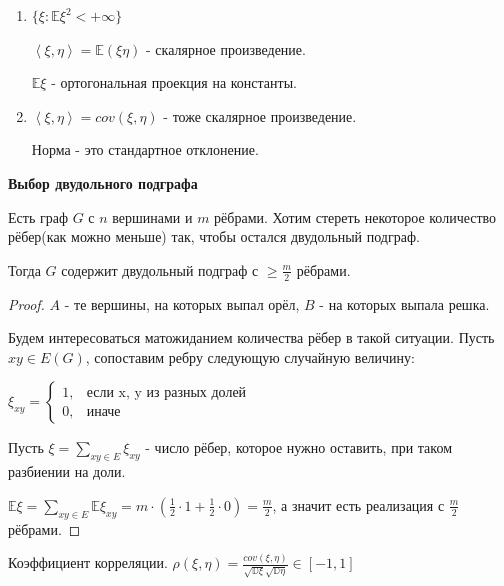 \begin{remark}
    \begin{enumerate}
        \item {
            $\{ \xi : \mathbb{E} \xi^2 < +\infty \}$

            $\left <\xi, \eta \right > = \mathbb{E} (\xi \eta)$ - скалярное произведение.

            $\mathbb{E} \xi$ - ортогональная проекция на константы.
        }
        \item {
            $\left < \xi, \eta \right > = cov (\xi, \eta)$ - тоже скалярное произведение.

            Норма - это стандартное отклонение.
        }
    \end{enumerate}
\end{remark}

\begin{theorem}
    \textbf{Выбор двудольного подграфа}

    Есть граф $G$ с $n$ вершинами и $m$ рёбрами. Хотим стереть некоторое количество рёбер(как можно меньше) так, чтобы
    остался двудольный подграф.

    Тогда $G$ содержит двудольный подграф с $\geqslant \frac{m}{2}$ рёбрами.
\end{theorem}

\begin{proof}
    $A$ - те вершины, на которых выпал орёл, $B$ - на которых выпала решка.

    Будем интересоваться матожиданием количества рёбер в такой ситуации. Пусть $xy \in E(G)$, сопоставим ребру
    следующую случайную величину:

    $
    \xi_{xy} =
    \begin{cases}
        1, & \text{если x, y из разных долей} \\
        0, & \text{иначе}
    \end{cases}
    $

    Пусть $\xi = \sum_{xy \in E} \xi_{xy}$ - число рёбер, которое нужно оставить, при таком разбиении на доли.

    $\mathbb{E} \xi = \sum_{xy \in E} \mathbb{E} \xi_{xy} = m \cdot (\frac{1}{2} \cdot 1 + \frac{1}{2} \cdot 0) = \frac{m}{2}$, а значит есть реализация с $\frac{m}{2}$ рёбрами.
\end{proof}

\begin{definition}
    Коэффициент корреляции. $\rho (\xi, \eta) = \frac{cov (\xi, \eta)}{\sqrt{\mathbb{D} \xi} \sqrt{\mathbb{D} \eta}} \in [-1, 1]$
\end{definition}

